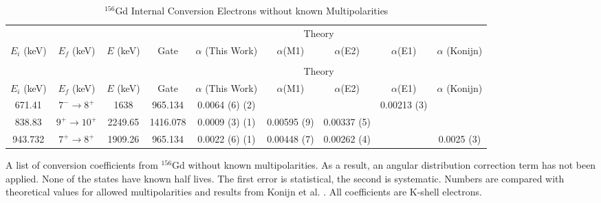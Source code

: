 \begin{landscape}
    \begin{longtable}{c|c|c|c|c|c|c|c|c}
        \caption{$^{156}$Gd Internal Conversion Electrons without known Multipolarities}
        \label{tab:156Gd_No_Mult_ICC}\\
        \toprule
        &	& 	&  &	& \multicolumn{2}{c}{Theory}	& 	\\
        $E_i$ (keV)	&	$E_f$ (keV)	& $E$ (keV)	&	Gate &		$\alpha$ (This Work)	& $\alpha$(M1) & $\alpha$(E2) & $\alpha$(E1) &	$\alpha$ (Konijn)	\\
        \hline		
        \endfirsthead
        \caption[]{$^{156}$Gd Internal Conversion Electrons without known Multipolarities}\\
        \toprule
        &	& 	&  &	& \multicolumn{2}{c}{Theory}	& 	\\
        $E_i$ (keV)	&	$E_f$ (keV)	& $E$ (keV)	&	Gate &		$\alpha$ (This Work)	& $\alpha$(M1) & $\alpha$(E2) & $\alpha$(E1) &	$\alpha$ (Konijn)	\\
        \hline		
        \endhead
        671.41	&	$7^-	\rightarrow	8^+$	&	1638	&	965.134	&		0.0064 (6) (2)	& & & 0.00213 (3) &	\\ \hline
        838.83	&	$9^+	\rightarrow	10^+$	&	2249.65	&	1416.078	&	0.0009 (3) (1)	& 0.00595 (9) & 0.00337 (5) & & 	\\ \hline
        943.732	&	$7^+	\rightarrow	8^+$	&	1909.26	&	965.134		&	0.0022 (6) (1) & 0.00448 (7) & 0.00262 (4) & &	0.0025 (3)	\\ 
        \bottomrule
    \end{longtable}
    \caption{A list of conversion coefficients from $^{156}$Gd without known multipolarities. As a result, an angular distribution correction term has not been applied. None of the states have known half lives. The first error is statistical, the second is systematic. Numbers are compared with theoretical values for allowed multipolarities and results from Konijn et al. \citep{konjin81:_156gd}. All coefficients are K-shell electrons.}
\end{landscape}
